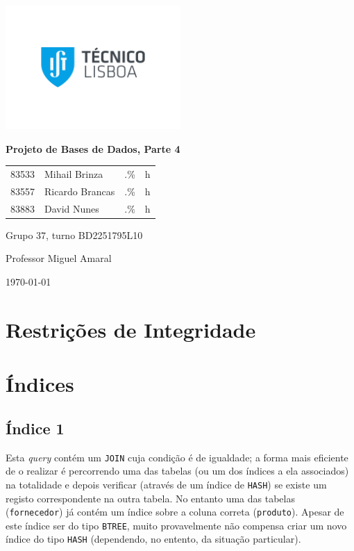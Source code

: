 \documentclass[a4paper]{article}
\begin{document}
    \begin{titlepage}
        \centering
        \includegraphics[width=0.5\textwidth]{IST_A_CMYK_POS.pdf}\par
        {\huge\bfseries Projeto de Bases de Dados, Parte 4\par}
        \vspace{2cm}
        {
        \Large
        \begin{tabular}{llll}
            83533 & Mihail Brinza & .\% & h \\
            83557 & Ricardo Brancas & .\% & h \\
            83883 & David Nunes & .\% & h
        \end{tabular}
        }
        \vfill
        \large
        Grupo 37, turno BD2251795L10 \par
        Professor Miguel Amaral

        \vspace{3cm}

        {\normalsize \today\par}
    \end{titlepage}

    \section{Restrições de Integridade}

    \section{Índices}

    \subsection{Índice 1}\label{subsec:ind1}
    Esta \textit{query} contém um \lstinline{JOIN} cuja condição é de igualdade; a forma mais eficiente de o
    realizar é percorrendo uma das tabelas (ou um dos índices a ela associados) na totalidade e depois verificar
    (através de um índice de \lstinline{HASH}) se existe um registo correspondente na outra tabela.
    No entanto uma das tabelas (\lstinline{fornecedor}) já contém um índice sobre a coluna correta
    (\lstinline{produto}). Apesar de este índice ser do tipo \lstinline{BTREE}, muito provavelmente
    não compensa criar um novo índice do tipo \lstinline{HASH} (dependendo, no entento, da situação particular).
\end{document}
